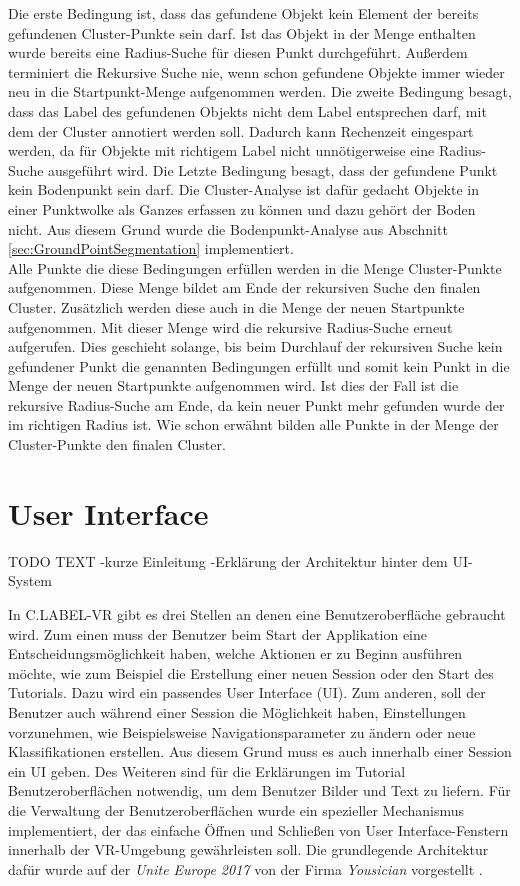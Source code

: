 Die erste Bedingung ist, dass das gefundene Objekt kein Element der bereits gefundenen Cluster-Punkte sein darf. Ist das Objekt in der Menge enthalten wurde bereits eine Radius-Suche für diesen Punkt durchgeführt. Außerdem terminiert die Rekursive Suche nie, wenn schon gefundene Objekte immer wieder neu in die Startpunkt-Menge aufgenommen werden. Die zweite Bedingung besagt, dass das Label des gefundenen Objekts nicht dem Label entsprechen darf, mit dem der Cluster annotiert werden soll. Dadurch kann Rechenzeit eingespart werden, da für Objekte mit richtigem Label nicht unnötigerweise eine Radius-Suche ausgeführt wird. Die Letzte Bedingung besagt, dass der gefundene Punkt kein Bodenpunkt sein darf. Die Cluster-Analyse ist dafür gedacht Objekte in einer Punktwolke als Ganzes erfassen zu können und dazu gehört der Boden nicht. Aus diesem Grund wurde die Bodenpunkt-Analyse aus Abschnitt \ref{sec:GroundPointSegmentation} implementiert.\\

Alle Punkte die diese Bedingungen erfüllen werden in die Menge Cluster-Punkte aufgenommen. Diese Menge bildet am Ende der rekursiven Suche den finalen Cluster. Zusätzlich werden diese auch in die Menge der neuen Startpunkte aufgenommen. Mit dieser Menge wird die rekursive Radius-Suche erneut aufgerufen. Dies geschieht solange, bis beim Durchlauf der rekursiven Suche kein gefundener Punkt die genannten Bedingungen erfüllt und somit kein Punkt in die Menge der neuen Startpunkte aufgenommen wird. Ist dies der Fall ist die rekursive Radius-Suche am Ende, da kein neuer Punkt mehr gefunden wurde der im richtigen Radius ist. Wie schon erwähnt bilden alle Punkte in der Menge der Cluster-Punkte den finalen Cluster.  

\section{User Interface}
\label{sec:UIMenu}
TODO TEXT
-kurze Einleitung
-Erklärung der Architektur hinter dem UI-System

In C.LABEL-VR gibt es drei Stellen an denen eine Benutzeroberfläche gebraucht wird. Zum einen muss der Benutzer beim Start der Applikation eine Entscheidungsmöglichkeit haben, welche Aktionen er zu Beginn ausführen möchte, wie zum Beispiel die Erstellung einer neuen Session oder den Start des Tutorials. Dazu wird ein passendes User Interface (UI). Zum anderen, soll der Benutzer auch während einer Session die Möglichkeit haben, Einstellungen vorzunehmen, wie Beispielsweise Navigationsparameter zu ändern oder neue Klassifikationen erstellen. Aus diesem Grund muss es auch innerhalb einer Session ein UI geben. Des Weiteren sind für die Erklärungen im Tutorial Benutzeroberflächen notwendig, um dem Benutzer Bilder und Text zu liefern. Für die Verwaltung der Benutzeroberflächen wurde ein spezieller Mechanismus implementiert, der das einfache Öffnen und Schließen von User Interface-Fenstern innerhalb der VR-Umgebung gewährleisten soll. Die grundlegende Architektur dafür wurde auf der \textit{Unite Europe 2017} von der Firma \textit{Yousician} vorgestellt \cite{bib:UnityMenuSystem}.\\

